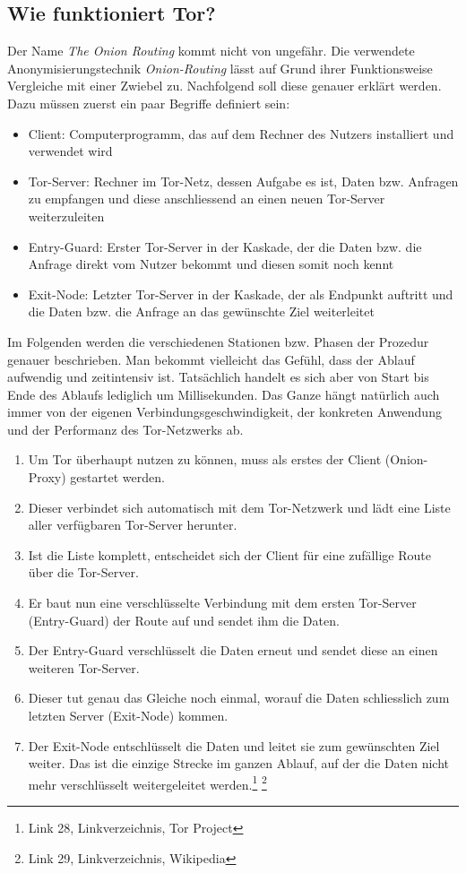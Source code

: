 \subsection{Wie funktioniert Tor?}
Der Name \textit{The Onion Routing} kommt nicht von ungefähr. Die verwendete Anonymisierungstechnik \textit{Onion-Routing} lässt auf Grund ihrer Funktionsweise Vergleiche mit einer Zwiebel zu. Nachfolgend soll diese genauer erklärt werden. Dazu müssen zuerst ein paar Begriffe definiert sein:
\begin{itemize}
\item Client: Computerprogramm, das auf dem Rechner des Nutzers installiert und verwendet wird
\item Tor-Server: Rechner im Tor-Netz, dessen Aufgabe es ist, Daten bzw. Anfragen zu empfangen und diese anschliessend an einen neuen Tor-Server weiterzuleiten
\item Entry-Guard: Erster Tor-Server in der Kaskade, der die Daten bzw. die Anfrage direkt vom Nutzer bekommt und diesen somit noch kennt
\item Exit-Node: Letzter Tor-Server in der Kaskade, der als Endpunkt auftritt und die Daten bzw. die Anfrage an das gewünschte Ziel weiterleitet
\end{itemize}

Im Folgenden werden die verschiedenen Stationen bzw. Phasen der Prozedur genauer beschrieben. Man bekommt vielleicht das Gefühl, dass der Ablauf aufwendig und zeitintensiv ist. Tatsächlich handelt es sich aber von Start bis Ende des Ablaufs lediglich um Millisekunden. Das Ganze hängt natürlich auch immer von der eigenen Verbindungsgeschwindigkeit, der konkreten Anwendung und der Performanz des Tor-Netzwerks ab.

\begin{enumerate}
\item Um Tor überhaupt nutzen zu können, muss als erstes der  Client (Onion-Proxy) gestartet werden.
\item Dieser verbindet sich automatisch mit dem Tor-Netzwerk und lädt eine Liste aller verfügbaren Tor-Server herunter.
\item Ist die Liste komplett, entscheidet sich der Client für eine zufällige Route über die Tor-Server.
\item Er baut nun eine verschlüsselte Verbindung mit dem ersten Tor-Server (Entry-Guard) der Route auf und sendet ihm die Daten.
\item Der Entry-Guard verschlüsselt die Daten erneut und sendet diese an einen weiteren Tor-Server.
\item Dieser tut genau das Gleiche noch einmal, worauf die Daten schliesslich zum letzten Server (Exit-Node) kommen.
\item Der Exit-Node entschlüsselt die Daten und leitet sie zum gewünschten Ziel weiter. Das ist die einzige Strecke im ganzen Ablauf, auf der die Daten nicht mehr verschlüsselt weitergeleitet werden.\footnote{Link 28, Linkverzeichnis, Tor Project}
\footnote{Link 29, Linkverzeichnis, Wikipedia}
\end{enumerate}

